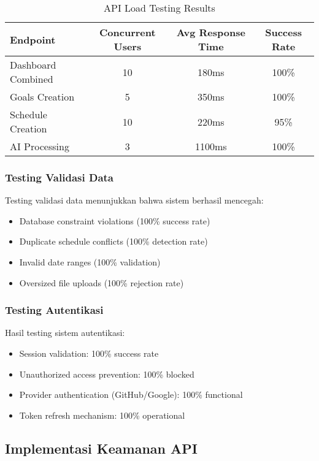 \begin{table}[H]
\centering
\caption{API Load Testing Results}
\begin{tabular}{|l|c|c|c|}
\hline
\textbf{Endpoint} & \textbf{Concurrent Users} & \textbf{Avg Response Time} & \textbf{Success Rate} \\
\hline
Dashboard Combined & 10 & 180ms & 100\% \\
Goals Creation & 5 & 350ms & 100\% \\
Schedule Creation & 10 & 220ms & 95\% \\
AI Processing & 3 & 1100ms & 100\% \\
\hline
\end{tabular}
\end{table}

\subsubsection{Testing Validasi Data}

Testing validasi data menunjukkan bahwa sistem berhasil mencegah:
\begin{itemize}
\item Database constraint violations (100\% success rate)
\item Duplicate schedule conflicts (100\% detection rate)
\item Invalid date ranges (100\% validation)
\item Oversized file uploads (100\% rejection rate)
\end{itemize}

\subsubsection{Testing Autentikasi}

Hasil testing sistem autentikasi:
\begin{itemize}
\item Session validation: 100\% success rate
\item Unauthorized access prevention: 100\% blocked
\item Provider authentication (GitHub/Google): 100\% functional
\item Token refresh mechanism: 100\% operational
\end{itemize}

\subsection{Implementasi Keamanan API}

